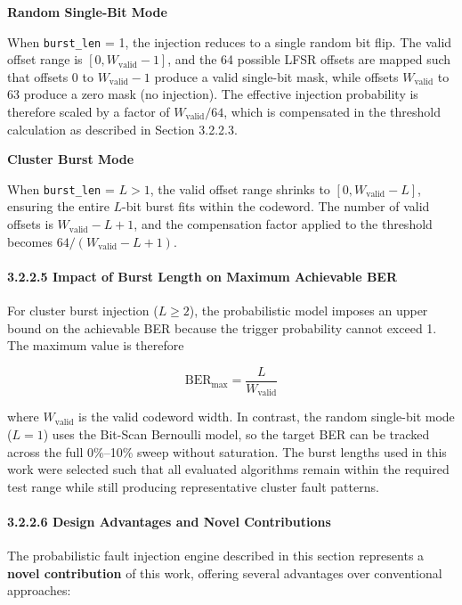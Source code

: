 \textbf{Random Single-Bit Mode}

When \texttt{burst\_len} = 1, the injection reduces to a single random
bit flip. The valid offset range is \([0, W_{\text{valid}} - 1]\), and
the 64 possible LFSR offsets are mapped such that offsets 0 to
\(W_{\text{valid}} - 1\) produce a valid single-bit mask, while offsets
\(W_{\text{valid}}\) to 63 produce a zero mask (no injection). The
effective injection probability is therefore scaled by a factor of
\(W_{\text{valid}} / 64\), which is compensated in the threshold
calculation as described in Section 3.2.2.3.

\textbf{Cluster Burst Mode}

When \texttt{burst\_len} = \(L > 1\), the valid offset range shrinks to
\([0, W_{\text{valid}} - L]\), ensuring the entire \(L\)-bit burst fits
within the codeword. The number of valid offsets is
\(W_{\text{valid}} - L + 1\), and the compensation factor applied to the
threshold becomes \(64 / (W_{\text{valid}} - L + 1)\).

\paragraph{3.2.2.5 Impact of Burst Length on Maximum Achievable
BER}\label{impact-of-burst-length-on-maximum-achievable-ber}

For cluster burst injection (\(L \geq 2\)), the probabilistic model
imposes an upper bound on the achievable BER because the trigger
probability cannot exceed 1. The maximum value is therefore

\[\text{BER}_{\text{max}} = \frac{L}{W_{\text{valid}}}\]

where \(W_{\text{valid}}\) is the valid codeword width. In contrast, the
random single-bit mode (\(L=1\)) uses the Bit-Scan Bernoulli model, so
the target BER can be tracked across the full 0\%--10\% sweep without
saturation. The burst lengths used in this work were selected such that
all evaluated algorithms remain within the required test range while
still producing representative cluster fault patterns.

\paragraph{3.2.2.6 Design Advantages and Novel
Contributions}\label{design-advantages-and-novel-contributions}

The probabilistic fault injection engine described in this section
represents a \textbf{novel contribution} of this work, offering several
advantages over conventional approaches:

